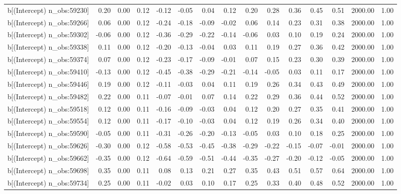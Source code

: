\begin{table}[ht]
\begin{tabular}{rrrrrrrrrrrrrrr}
  b[(Intercept) n\_obs:59230] & 0.20 & 0.00 & 0.12 & -0.12 & -0.05 & 0.04 & 0.12 & 0.20 & 0.28 & 0.36 & 0.45 & 0.51 & 2000.00 & 1.00 \\ 
  b[(Intercept) n\_obs:59266] & 0.06 & 0.00 & 0.12 & -0.24 & -0.18 & -0.09 & -0.02 & 0.06 & 0.14 & 0.23 & 0.31 & 0.38 & 2000.00 & 1.00 \\ 
  b[(Intercept) n\_obs:59302] & -0.06 & 0.00 & 0.12 & -0.36 & -0.29 & -0.22 & -0.14 & -0.06 & 0.03 & 0.10 & 0.19 & 0.24 & 2000.00 & 1.00 \\ 
  b[(Intercept) n\_obs:59338] & 0.11 & 0.00 & 0.12 & -0.20 & -0.13 & -0.04 & 0.03 & 0.11 & 0.19 & 0.27 & 0.36 & 0.42 & 2000.00 & 1.00 \\ 
  b[(Intercept) n\_obs:59374] & 0.07 & 0.00 & 0.12 & -0.23 & -0.17 & -0.09 & -0.01 & 0.07 & 0.15 & 0.23 & 0.30 & 0.39 & 2000.00 & 1.00 \\ 
  b[(Intercept) n\_obs:59410] & -0.13 & 0.00 & 0.12 & -0.45 & -0.38 & -0.29 & -0.21 & -0.14 & -0.05 & 0.03 & 0.11 & 0.17 & 2000.00 & 1.00 \\ 
  b[(Intercept) n\_obs:59446] & 0.19 & 0.00 & 0.12 & -0.11 & -0.03 & 0.04 & 0.11 & 0.19 & 0.26 & 0.34 & 0.43 & 0.49 & 2000.00 & 1.00 \\ 
  b[(Intercept) n\_obs:59482] & 0.22 & 0.00 & 0.11 & -0.07 & -0.01 & 0.07 & 0.14 & 0.22 & 0.29 & 0.36 & 0.44 & 0.52 & 2000.00 & 1.00 \\ 
  b[(Intercept) n\_obs:59518] & 0.12 & 0.00 & 0.11 & -0.16 & -0.09 & -0.03 & 0.04 & 0.12 & 0.20 & 0.27 & 0.35 & 0.41 & 2000.00 & 1.00 \\ 
  b[(Intercept) n\_obs:59554] & 0.12 & 0.00 & 0.11 & -0.17 & -0.10 & -0.03 & 0.04 & 0.12 & 0.19 & 0.26 & 0.34 & 0.40 & 2000.00 & 1.00 \\ 
  b[(Intercept) n\_obs:59590] & -0.05 & 0.00 & 0.11 & -0.31 & -0.26 & -0.20 & -0.13 & -0.05 & 0.03 & 0.10 & 0.18 & 0.25 & 2000.00 & 1.00 \\ 
  b[(Intercept) n\_obs:59626] & -0.30 & 0.00 & 0.12 & -0.58 & -0.53 & -0.45 & -0.38 & -0.29 & -0.22 & -0.15 & -0.07 & -0.01 & 2000.00 & 1.00 \\ 
  b[(Intercept) n\_obs:59662] & -0.35 & 0.00 & 0.12 & -0.64 & -0.59 & -0.51 & -0.44 & -0.35 & -0.27 & -0.20 & -0.12 & -0.05 & 2000.00 & 1.00 \\ 
  b[(Intercept) n\_obs:59698] & 0.35 & 0.00 & 0.11 & 0.08 & 0.13 & 0.21 & 0.27 & 0.35 & 0.43 & 0.51 & 0.57 & 0.64 & 2000.00 & 1.00 \\ 
  b[(Intercept) n\_obs:59734] & 0.25 & 0.00 & 0.11 & -0.02 & 0.03 & 0.10 & 0.17 & 0.25 & 0.33 & 0.40 & 0.48 & 0.52 & 2000.00 & 1.00 \\ 

\end{tabular}
\end{table}

